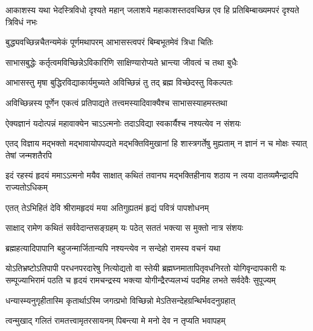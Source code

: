 \threelineshloka
{आकाशस्य यथा भेदस्त्रिविधो दृश्यते महान्}
{जलाशये महाकाशस्तदवच्छिन्न एव हि}
{प्रतिबिम्बाख्यमपरं दृश्यते त्रिविधं नभः} %

\twolineshloka
{बुद्ध्यवच्छिन्नचैतन्यमेकं पूर्णमथापरम्}
{आभासस्त्वपरं बिम्बभूतमेवं त्रिधा चितिः} %

\twolineshloka
{साभासबुद्धेः कर्तृत्वमविच्छिन्नेऽविकारिणि}
{साक्षिण्यारोप्यते भ्रान्त्या जीवत्वं च तथा बुधैः} %

\twolineshloka
{आभासस्तु मृषा बुद्धिरविद्याकार्यमुच्यते}
{अविच्छिन्नं तु तद् ब्रह्म विच्छेदस्तु विकल्पतः} %

\twolineshloka
{अविच्छिन्नस्य पूर्णेन एकत्वं प्रतिपाद्यते}
{तत्त्वमस्यादिवाक्यैश्च साभासस्याहमस्तथा} %

\twolineshloka
{ऐक्यज्ञानं यदोत्पन्नं महावाक्येन चाऽऽत्मनोः}
{तदाऽविद्या स्वकार्यैश्च नश्यत्येव न संशयः} %

\threelineshloka
{एतद् विज्ञाय मद्भक्तो मद्भावायोपपद्यते}
{मद्भक्तिविमुखानां हि शास्त्रगर्तेषु मुह्यताम्}
{न ज्ञानं न च मोक्षः स्यात् तेषां जन्मशतैरपि} %

\fourlineindentedshloka
{इदं रहस्यं हृदयं ममाऽऽत्मनो}
{मयैव साक्षात् कथितं तवानघ}
{मद्भक्तिहीनाय शठाय न त्वया}
{दातव्यमैन्द्रादपि राज्यतोऽधिकम्} %


\twolineshloka
{एतत् तेऽभिहितं देवि श्रीरामहृदयं मया}
{अतिगुह्यतमं हृद्यं पवित्रं पापशोधनम्} %

\twolineshloka
{साक्षाद् रामेण कथितं सर्ववेदान्तसङ्ग्रहम्}
{यः पठेत् सततं भक्त्या स मुक्तो नात्र संशयः} %

\twolineshloka
{ब्रह्महत्यादिपापानि बहुजन्मार्जितान्यपि}
{नश्यन्त्येव न सन्देहो रामस्य वचनं यथा} %

\fourlineindentedshloka
{योऽतिभ्रष्टोऽतिपापी परधनपरदारेषु नित्योद्यतो वा}
{स्तेयी ब्रह्मघ्नमातापितृवधनिरतो योगिवृन्दापकारी}
{यः सम्पूज्याभिरामं पठति च हृदयं रामचन्द्रस्य भक्त्या}
{योगीन्द्रैरप्यलभ्यं पदमिह लभते सर्वदेवैः सुपूज्यम्} %




\twolineshloka
{धन्यास्म्यनुगृहीतास्मि कृतार्थाऽस्मि जगत्प्रभो}
{विच्छिन्नो मेऽतिसन्देहग्रन्थिर्भवदनुग्रहात्} %

\twolineshloka
{त्वन्मुखाद् गलितं रामतत्त्वामृतरसायनम्}
{पिबन्त्या मे मनो देव न तृप्यति भवापहम्} %

